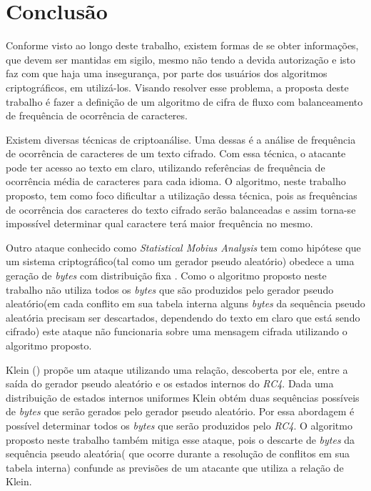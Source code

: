 \chapter{Conclusão}
\label{conclusion}


Conforme visto ao longo deste trabalho, existem formas de se obter informações, que devem ser mantidas em sigilo, mesmo não tendo a devida autorização e isto faz com que haja uma insegurança, por parte dos usuários dos algoritmos criptográficos, em utilizá-los. Visando resolver esse problema, a proposta deste trabalho é fazer a definição de um algoritmo de cifra de fluxo com balanceamento de frequência de ocorrência de caracteres.

Existem diversas técnicas de criptoanálise. Uma dessas é a análise de frequência de ocorrência de caracteres de um texto cifrado. Com essa técnica, o atacante pode ter acesso ao texto em claro, utilizando referências de frequência de ocorrência média de caracteres para cada idioma. O algoritmo, neste trabalho proposto, tem como foco dificultar a utilização dessa técnica, pois as frequências de ocorrência dos caracteres do texto cifrado serão balanceadas e assim torna-se impossível determinar qual caractere terá maior frequência no mesmo.

Outro ataque conhecido como \textit{Statistical Mobius Analysis} tem como hipótese  que um sistema criptográfico(tal como um gerador pseudo aleatório) obedece a uma geração de \textit{bytes} com distribuição fixa \cite{eric-filiol}. Como o algoritmo proposto neste trabalho não utiliza todos os \textit{bytes} que são produzidos pelo gerador pseudo aleatório(em cada conflito em sua tabela interna alguns \textit{bytes} da sequência pseudo aleatória precisam ser descartados, dependendo do texto em claro que está sendo cifrado) este ataque não funcionaria sobre uma mensagem cifrada utilizando o algoritmo proposto.

Klein (\citeyear{andreas-klein}) propõe um ataque utilizando uma relação, descoberta por ele, entre a saída do gerador pseudo aleatório e os estados internos do \textit{RC4}. Dada uma distribuição de estados internos uniformes Klein obtém duas sequências possíveis de \textit{bytes} que serão gerados pelo gerador pseudo aleatório. Por essa abordagem é possível determinar todos os \textit{bytes} que serão produzidos pelo \textit{RC4}. O algoritmo proposto neste trabalho também mitiga esse ataque, pois o descarte de \textit{bytes} da sequência pseudo aleatória( que ocorre durante a resolução de conflitos em sua tabela interna) confunde as previsões de um atacante que utiliza a relação de Klein.
 
